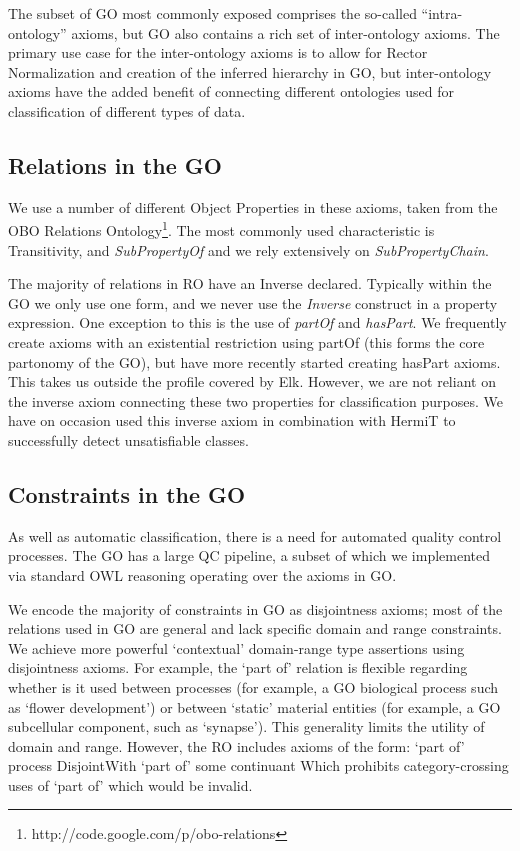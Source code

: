 \documentclass{llncs}
\begin{document}
The subset of GO most commonly exposed comprises the so-called
``intra-ontology'' axioms, but GO also contains a rich set of
inter-ontology axioms. The primary use case for the inter-ontology
axioms is to allow for Rector Normalization and creation of the
inferred hierarchy in GO, but inter-ontology axioms have the added
benefit of connecting different ontologies used for classification of
different types of data.

\subsection{Relations in the GO}

We use a number of different Object Properties in these axioms, taken
from the OBO Relations
Ontology\footnote{http://code.google.com/p/obo-relations}. The most
commonly used characteristic is Transitivity, and \emph{SubPropertyOf}
and we rely extensively on \emph{SubPropertyChain}.

The majority of relations in RO have an Inverse declared. Typically
within the GO we only use one form, and we never use the
\emph{Inverse} construct in a property expression. One exception to
this is the use of \emph{partOf} and \emph{hasPart}. We frequently
create axioms with an existential restriction using partOf (this forms
the core partonomy of the GO), but have more recently started creating
hasPart axioms\cite{berardini2010gene}. This takes us outside the
profile covered by Elk. However, we are not reliant on the inverse
axiom connecting these two properties for classification purposes. We
have on occasion used this inverse axiom in combination with HermiT to
successfully detect unsatisfiable classes.

\subsection{Constraints in the GO}

As well as automatic classification, there is a need for automated
quality control processes. The GO has a large QC pipeline, a subset of
which we implemented via standard OWL reasoning operating over the
axioms in GO.

We encode the majority of constraints in GO as disjointness axioms;
most of the relations used in GO are general and lack specific domain
and range constraints. We achieve more powerful ‘contextual’
domain-range type assertions using disjointness axioms. For example,
the `part of' relation is flexible regarding whether is it used
between processes (for example, a GO biological process such as
‘flower development’) or between ‘static’ material entities (for
example, a GO subcellular component, such as ‘synapse’). This
generality limits the utility of domain and range. However, the RO
includes axioms of the form: `part of' process DisjointWith `part of' %
some continuant Which prohibits category-crossing uses of `part of'
which would be invalid.
\end{document}
